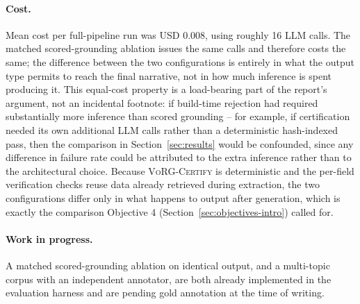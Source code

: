 \documentclass[12pt,a4paper]{report}
\begin{document}
\paragraph{Cost.}
Mean cost per full-pipeline run was USD 0.008, using roughly 16 LLM calls. The
matched scored-grounding ablation issues the same calls and therefore costs
the same; the difference between the two configurations is entirely in what
the output type permits to reach the final narrative, not in how much
inference is spent producing it. This equal-cost property is a load-bearing
part of the report's argument, not an incidental footnote: if build-time
rejection had required substantially more inference than scored grounding --
for example, if certification needed its own additional LLM calls rather than
a deterministic hash-indexed pass, then the comparison in
Section~\ref{sec:results} would be confounded, since any difference in
failure rate could be attributed to the extra inference rather than to the
architectural choice. Because \textsc{VoRG-Certify} is deterministic and the
per-field verification checks reuse data already retrieved during extraction,
the two configurations differ only in what happens to output after
generation, which is exactly the comparison Objective 4
(Section~\ref{sec:objectives-intro}) called for.

\paragraph{Work in progress.}
A matched scored-grounding ablation on identical output, and a multi-topic
corpus with an independent annotator, are both already implemented in the
evaluation harness and are pending gold annotation at the time of writing.
\end{document}
